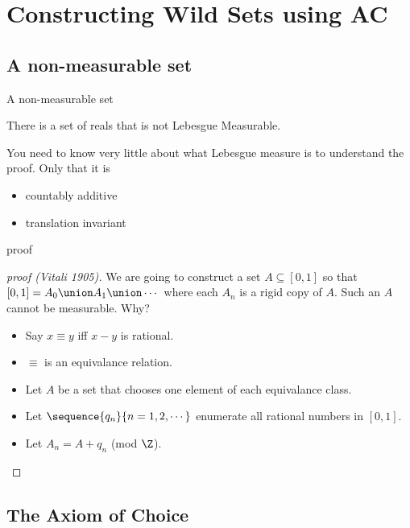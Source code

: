 \documentclass{beamer}
\begin{document}
\section{Constructing Wild Sets using AC}

\subsection{A non-measurable set}

\begin{frame}{A non-measurable set}
\begin{theorem}
There is a set of reals that is not Lebesgue Measurable.
\end{theorem}

\vfill

\pause
You need to know very little  about what Lebesgue measure is to
understand the proof. Only that it is
\begin{itemize}
  \item countably additive
  \item translation invariant
\end{itemize}

\end{frame}


\begin{frame}{proof}

\begin{proof}[proof (Vitali 1905)]
We are going to construct a set
$A \subseteq [0, 1]$ so that $[0,1] = A_0 \union A_1 \union \cdots$ where each
$A_n$ is a rigid copy of $A$. Such an $A$ cannot be measurable. Why?

\begin{itemize}
  \item Say $x\equiv y$ iff $x-y$ is rational.
  \item $\equiv$ is an equivalance relation.
  \item Let $A$ be a set that chooses one element of each equivalance class.
  \item Let $\sequence{q_n}{n = 1,2,\cdots}$ enumerate all rational numbers in
$[0,1]$.
   \item Let $A_n = A + q_n$ (mod $\Z$).
\end{itemize}
\end{proof}
\end{frame}

\subsection{The Axiom of Choice}
\end{document}
